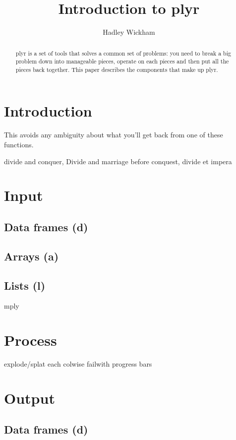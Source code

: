 \documentclass[letterpaper,oneside]{scrartcl}
\title{Introduction to plyr}
\author{Hadley Wickham}
\begin{document}
\maketitle

\begin{abstract}
  plyr is a set of tools that solves a common set of problems: you need to break a big problem down into manageable pieces, operate on each pieces and then put all the pieces back together.  This paper describes the components that make up plyr.
\end{abstract}

\section{Introduction}

This avoids any ambiguity about what you'll get back from one of these functions.  

divide and conquer, Divide and marriage before conquest, divide et impera

\section{Input} 

\subsection{Data frames (d)}
\subsection{Arrays (a)}
\subsection{Lists (l)}

mply

\section{Process}

explode/splat
each
colwise
failwith
progress bars

\section{Output}

\subsection{Data frames (d)}
\end{document}
